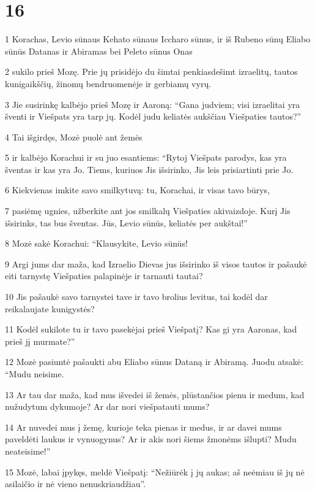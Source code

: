 \chapter{16}


\par 1 Korachas, Levio sūnaus Kehato sūnaus Iccharo sūnus, ir iš Rubeno sūnų Eliabo sūnūs Datanas ir Abiramas bei Peleto sūnus Onas 
\par 2 sukilo prieš Mozę. Prie jų prisidėjo du šimtai penkiasdešimt izraelitų, tautos kunigaikščių, žinomų bendruomenėje ir gerbiamų vyrų. 
\par 3 Jie susirinkę kalbėjo prieš Mozę ir Aaroną: “Gana judviem; visi izraelitai yra šventi ir Viešpats yra tarp jų. Kodėl judu keliatės aukščiau Viešpaties tautos?” 
\par 4 Tai išgirdęs, Mozė puolė ant žemės 
\par 5 ir kalbėjo Korachui ir su juo esantiems: “Rytoj Viešpats parodys, kas yra šventas ir kas yra Jo. Tiems, kuriuos Jis išsirinko, Jis leis prisiartinti prie Jo. 
\par 6 Kiekvienas imkite savo smilkytuvą: tu, Korachai, ir visas tavo būrys, 
\par 7 pasiėmę ugnies, užberkite ant jos smilkalų Viešpaties akivaizdoje. Kurį Jis išsirinks, tas bus šventas. Jūs, Levio sūnūs, keliatės per aukštai!” 
\par 8 Mozė sakė Korachui: “Klausykite, Levio sūnūs! 
\par 9 Argi jums dar maža, kad Izraelio Dievas jus išsirinko iš visos tautos ir pašaukė eiti tarnystę Viešpaties palapinėje ir tarnauti tautai? 
\par 10 Jis pašaukė savo tarnystei tave ir tavo brolius levitus, tai kodėl dar reikalaujate kunigystės? 
\par 11 Kodėl sukilote tu ir tavo pasekėjai prieš Viešpatį? Kas gi yra Aaronas, kad prieš jį murmate?” 
\par 12 Mozė pasiuntė pašaukti abu Eliabo sūnus Dataną ir Abiramą. Juodu atsakė: “Mudu neisime. 
\par 13 Ar tau dar maža, kad mus išvedei iš žemės, plūstančios pienu ir medum, kad nužudytum dykumoje? Ar dar nori viešpatauti mums? 
\par 14 Ar nuvedei mus į žemę, kurioje teka pienas ir medus, ir ar davei mums paveldėti laukus ir vynuogynus? Ar ir akis nori šiems žmonėms išlupti? Mudu neateisime!” 
\par 15 Mozė, labai įpykęs, meldė Viešpatį: “Nežiūrėk į jų aukas; aš neėmiau iš jų nė asilaičio ir nė vieno nenuskriaudžiau”. 
